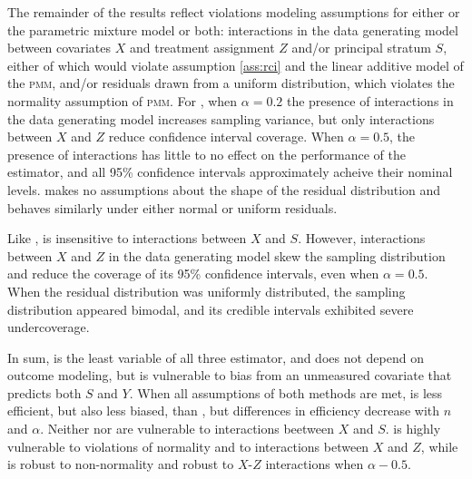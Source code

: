 \documentclass[]{article}
\begin{document}
The remainder of the results reflect violations modeling assumptions for either \geepers or the parametric mixture model or both: interactions in the data generating model between covariates $X$ and treatment assignment $Z$ and/or principal stratum $S$, either of which would violate assumption \ref{ass:rci} and the linear additive model of the \textsc{pmm}, and/or residuals drawn from a uniform distribution, which violates the normality assumption of \textsc{pmm}.
For \geepers, when $\alpha=0.2$ the presence of interactions in the data generating model increases sampling variance, but only interactions between $X$ and $Z$ reduce confidence interval coverage. When $\alpha=0.5$, the presence of interactions has little to no effect on the performance of the \geepers estimator, and all 95\% confidence intervals approximately acheive their nominal levels. \geepers makes no assumptions about the shape of the residual distribution and behaves similarly under either normal or uniform residuals.

Like \geepers, \pmm is insensitive to interactions between $X$ and $S$. However, interactions between $X$ and $Z$ in the data generating model skew the \pmm sampling distribution and reduce the coverage of its 95\% confidence intervals, even when $\alpha=0.5$.
When the residual distribution was uniformly distributed, the \pmm sampling distribution appeared bimodal, and its credible intervals exhibited severe undercoverage.

In sum, \psw is the least variable of all three estimator, and does not depend on outcome modeling, but is vulnerable to bias from an unmeasured covariate that predicts both $S$ and $Y$.
When all assumptions of both methods are met, \geepers is less efficient, but also less biased, than \pmm, but differences in efficiency decrease with $n$ and $\alpha$.
Neither \psw nor \pmm are vulnerable to interactions beetween $X$ and $S$.
\pmm is highly vulnerable to violations of normality and to interactions between $X$ and $Z$, while \psw is robust to non-normality and robust to $X$-$Z$ interactions when $\alpha-0.5$.
\end{document}
